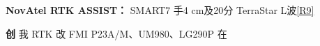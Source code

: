 \documentclass[11pt,a4paper]{article}
\numberwithin{equation}{section}
\numberwithin{figure}{section}
\begin{document}
\textbf{NovAtel RTK ASSIST{\cjkfont ：}\allowbreak{}} SMART7 {\cjkfont 手}\allowbreak{}4 cm{\cjkfont 及}\allowbreak{}20{\cjkfont 分}\allowbreak{} TerraStar L{\cjkfont 波}\allowbreak{}\hyperlink{ref-R9}{[R9]}

\textbf{{\cjkfont 创}\allowbreak{}} {\cjkfont 我}\allowbreak{} RTK {\cjkfont 改}\allowbreak{} FMI P23A/\allowbreak{}M{\cjkfont 、}\allowbreak{}UM980{\cjkfont 、}\allowbreak{}LG290P {\cjkfont 在}\allowbreak{}
\end{document}
